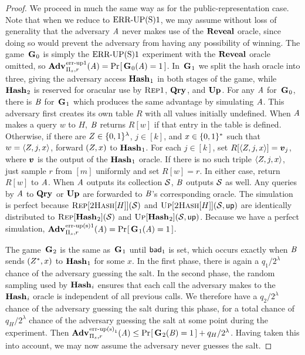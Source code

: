 \begin{proof} We proceed in much the same way as for the public-representation case. Note that when we reduce to $\textnormal{ERR\mbox{-}UP(S)}1$, we may assume without loss of generality that the adversary $\mathit{A}$ never makes use of the $\mathbf{Reveal}$ oracle, since doing so would prevent the adversary from having any possibility of winning. The game~$\mathbf{G}\hspace{0.5pt}_0$ is simply the $\textnormal{ERR\mbox{-}UP(S)}1$ experiment with the $\mathbf{Reveal}$ oracle omitted, so $\Adv{\errep1}_{\struct_s,r}(\advA) = \Prob{\G_0(\advA) = 1}$. In~$\mathbf{G}\hspace{0.5pt}_1$ we split the hash oracle into three, giving the adversary access $\mathbf{Hash}\hspace{0.5pt}_1$ in both stages of the game, while $\mathbf{Hash}\hspace{0.5pt}_2$ is reserved for oracular use by $\textsc{Rep}1$, $\mathbf{Qry}\hspace{0.5pt}$, and $\mathbf{Up}\hspace{0.5pt}$. For any $\mathit{A}$ for~$\mathbf{G}\hspace{0.5pt}_0$, there is $\mathit{B}$ for~$\mathbf{G}\hspace{0.5pt}_1$ which produces the same advantage by simulating $\mathit{A}$. This adversary first creates its own table $R$ with all values initially undefined. When $\mathit{A}$ makes a query $w$ to $H$, $\mathit{B}$ returns $R[w]$ if that entry in the table is defined. Otherwise, if there are $Z \in \{0,1\}^\lambda$, $j \in [k]$, and $x \in \{0,1\}^*$ such that $w = \langle Z, j, x\rangle$, forward $(Z,x)$ to $\mathbf{Hash}\hspace{0.5pt}_1$. For each $j \in [k]$, set $R[\langle\salt, j, x\rangle] = \vv_j$, where $\vv$ is the output of the $\mathbf{Hash}\hspace{0.5pt}_1$ oracle. If there is no such triple $\langle Z, j, x\rangle$, just sample $r$ from $[m]$ uniformly and set $R[w] = r$. In either case, return $R[w]$ to $\mathit{A}$. When $\mathit{A}$ outputs its collection $\mathcal{S}$, $\mathit{B}$ outputs $\mathcal{S}$ as well. Any queries by $\mathit{A}$ to $\mathbf{Qry}\hspace{0.5pt}$ or $\mathbf{Up}\hspace{0.5pt}$ are forwarded to $\mathit{B}$'s corresponding oracle. The simulation is perfect because $\textsc{Rep}[\textsc{2Hash}[H]](\mathcal{S})$ and $\textsc{Up}[\textsc{2Hash}[H]](\mathcal{S},\mathsf{up})$ are identically distributed to $\textsc{Rep}[\mathbf{Hash}\hspace{0.5pt}_2](\mathcal{S})$ and $\textsc{Up}[\mathbf{Hash}\hspace{0.5pt}_2](\mathcal{S},\mathsf{up})$. Because we have a perfect simulation, $\Adv{\erreps1}_{\struct_s,r}(\advA) = \Prob{\G_1(\advA) = 1}$.

The game~$\mathbf{G}\hspace{0.5pt}_2$ is the same as~$\mathbf{G}\hspace{0.5pt}_1$ until $\mathsf{bad}_1$ is set, which occurs exactly when $\mathit{B}$ sends $(Z^*,x)$ to $\mathbf{Hash}\hspace{0.5pt}_1$ for some $x$. In the first phase, there is again a $q_1/2^\lambda$ chance of the adversary guessing the salt. In the second phase, the random sampling used by $\mathbf{Hash}\hspace{0.5pt}_i$ ensures that each call the adversary makes to the $\mathbf{Hash}\hspace{0.5pt}_i$ oracle is independent of all previous calls. We therefore have a $q_2/2^\lambda$ chance of the adversary guessing the salt during this phase, for a total chance of $q_H/2^\lambda$ chance of the adversary guessing the salt at some point during the experiment. Then $\Adv{\erreps_1}_{\struct_s,r}(\advA) \le \Prob{\G_2(\advB) = 1} + q_H/2^\lambda$. Having taken this into account, we may now assume the adversary never guesses the salt.


\end{proof}
